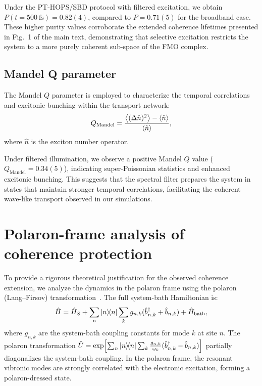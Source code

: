 \documentclass[11pt,a4paper]{article}
\begin{document}
Under the PT-HOPS/SBD protocol with filtered excitation, we obtain $P(t = \SI{500}{\femto\second}) = 0.82(4)$, compared to $P = 0.71(5)$ for the broadband case. These higher purity values corroborate the extended coherence lifetimes presented in Fig.~1 of the main text, demonstrating that selective excitation restricts the system to a more purely coherent sub-space of the FMO complex.

\subsection{Mandel Q parameter}

The Mandel $Q$ parameter is employed to characterize the temporal correlations and excitonic bunching within the transport network:
\begin{equation}
Q_{\mathrm{Mandel}} = \frac{\expval{(\Delta \hat{n})^2} - \expval{\hat{n}}}{\expval{\hat{n}}},
\label{eq:SI_mandel}
\end{equation}
where $\hat{n}$ is the exciton number operator.

Under filtered illumination, we observe a positive Mandel $Q$ value ($Q_{\mathrm{Mandel}} = 0.34(5)$), indicating super-Poissonian statistics and enhanced excitonic bunching. This suggests that the spectral filter prepares the system in states that maintain stronger temporal correlations, facilitating the coherent wave-like transport observed in our simulations.


\section{Polaron-frame analysis of coherence protection}
\label{sec:S7}

To provide a rigorous theoretical justification for the observed coherence extension, we analyze the dynamics in the polaron frame using the polaron (Lang--Firsov) transformation~\cite{Huelga2013,Chin2011}. The full system-bath Hamiltonian is:
\begin{equation}
\hat{H} = \hat{H}_S + \sum_n \dyad{n} \sum_k g_{n,k}(\hat{b}_{n,k}^\dagger + \hat{b}_{n,k}) + \hat{H}_{\mathrm{bath}},
\label{eq:SI_full_hamiltonian}
\end{equation}
where $g_{n,k}$ are the system-bath coupling constants for mode $k$ at site $n$. The polaron transformation $\hat{U} = \exp\!\left[\sum_n \dyad{n} \sum_k \frac{g_{n,k}}{\omega_k}(\hat{b}_{n,k}^\dagger - \hat{b}_{n,k})\right]$ partially diagonalizes the system-bath coupling. In the polaron frame, the resonant vibronic modes are strongly correlated with the electronic excitation, forming a polaron-dressed state.
\end{document}

